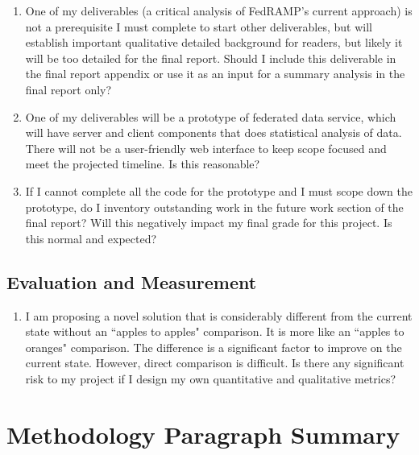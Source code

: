 \documentclass{jdf}
\begin{document}
\begin{enumerate}
    \item One of my deliverables (a critical analysis of FedRAMP's current approach) is not a prerequisite I must complete to start other deliverables, but will establish important qualitative detailed background for readers, but likely it will be too detailed for the final report. Should I include this deliverable in the final report appendix or use it as an input for a summary analysis in the final report only?
    \item One of my deliverables will be a prototype of federated data service, which will have server and client components that does statistical analysis of data. There will not be a user-friendly web interface to keep scope focused and meet the projected timeline. Is this reasonable?
    \item If I cannot complete all the code for the prototype and I must scope down the prototype, do I inventory outstanding work in the future work section of the final report? Will this negatively impact my final grade for this project. Is this normal and expected?
\end{enumerate}

\subsection*{Evaluation and Measurement}

\begin{enumerate}
    \item I am proposing a novel solution that is considerably different from the current state without an ``apples to apples" comparison. It is more like an ``apples to oranges" comparison. The difference is a significant factor to improve on the current state. However, direct comparison is difficult. Is there any significant risk to my project if I design my own quantitative and qualitative metrics?    
\end{enumerate}

\section*{Methodology Paragraph Summary}
\end{document}

